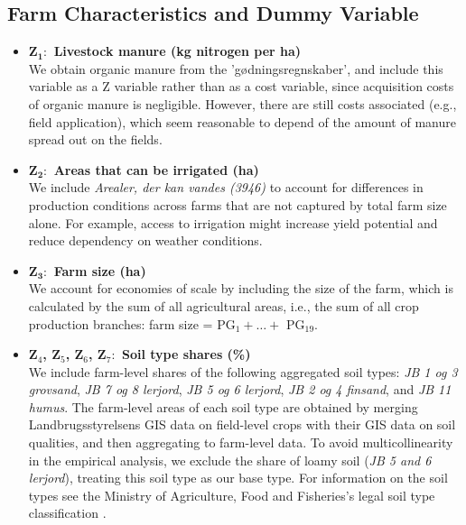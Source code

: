 \documentclass[12pt]{article}
\begin{document}
\subsection{Farm Characteristics and Dummy Variable}
\label{sec:farm-charactistics-organic-dummy}
\begin{itemize}
    \item[] \textbf{Z$_\textbf{1}:$ Livestock manure (kg nitrogen per ha)} \\[0.25cm]
    We obtain organic manure from the 'gødningsregnskaber', and include this variable as a Z variable rather than as a cost variable, since acquisition costs of organic manure is negligible. 
    However, there are still costs associated (e.g., field application), which seem reasonable to depend of the amount of manure spread out on the fields.
    \item[] \textbf{Z$_\textbf{2}:$ Areas that can be irrigated (ha)} \\[0.25cm]
    We include \textit{Arealer, der kan vandes (3946)}  to account for differences in production conditions across farms that are not captured by total farm size alone. For example, access to irrigation might increase yield potential and reduce dependency on weather conditions.
    \item[] \textbf{Z$_\textbf{3}:$ Farm size (ha)} \\[0.25cm]
    We account for economies of scale by including the size of the farm, which is calculated by the sum of all agricultural areas, i.e., the sum of all crop production branches: farm size = PG$_1 + \ldots + $ PG$_{19}$.
    \item[] \textbf{Z$_4$, Z$_5$, Z$_6$, Z$_7:$ Soil type shares (\%)} \\[0.25cm]
    We include farm-level shares of the following aggregated soil types: \textit{JB 1 og 3 grovsand}, \textit{JB 7 og 8 lerjord}, \textit{JB 5 og 6 lerjord}, \textit{JB 2 og 4 finsand}, and \textit{JB 11 humus}.
    The farm-level areas of each soil type are obtained by merging Landbrugsstyrelsens GIS data on field-level crops with their GIS data on soil qualities, and then aggregating to farm-level data. 
    To avoid multicollinearity in the empirical analysis, we exclude the share of loamy soil (\textit{JB 5 and 6 lerjord}), treating this soil type as our base type.
    For information on the soil types see the Ministry of Agriculture, Food and Fisheries's legal soil type classification \citep{jordbundstyper2024}. 

\end{itemize}
\end{document}
